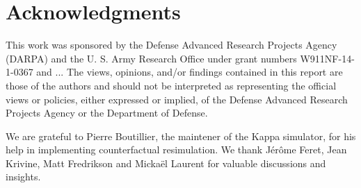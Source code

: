 \section*{Acknowledgments}

This work was sponsored by the Defense Advanced Research Projects
Agency (DARPA) and the U. S. Army Research Office under grant numbers
W911NF-14-1-0367 and ...  The views, opinions, and/or findings
contained in this report are those of the authors and should not be
interpreted as representing the official views or policies, either
expressed or implied, of the Defense Advanced Research Projects Agency
or the Department of Defense. 

We are grateful to Pierre Boutillier, the maintener of the Kappa
simulator, for his help in implementing counterfactual resimulation.
We thank J\'{e}r\^{o}me Feret, Jean Krivine,  Matt Fredrikson and
Micka\"{e}l Laurent for valuable discussions and insights.
